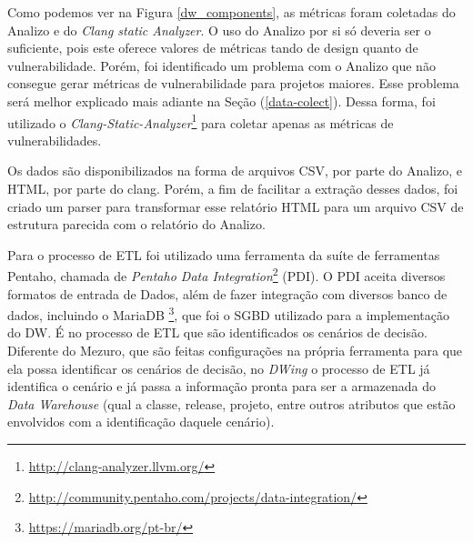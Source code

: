 Como podemos ver na Figura \ref{dw_components}, as métricas foram coletadas do Analizo e do \emph{Clang static Analyzer}. O uso do Analizo por si só deveria ser o suficiente, pois este oferece valores de métricas tando de design quanto de vulnerabilidade. Porém, foi identificado um problema com o Analizo que não consegue gerar métricas de vulnerabilidade para projetos maiores. Esse problema será melhor explicado mais adiante na Seção (\ref{data-colect}). Dessa forma, foi utilizado o \emph{Clang-Static-Analyzer}\footnote{\url{http://clang-analyzer.llvm.org/}} para coletar apenas as métricas de vulnerabilidades.

%
Os dados são disponibilizados na forma de arquivos CSV, por parte do Analizo, e HTML, por parte do clang. Porém, a fim de facilitar a extração desses dados, foi criado um parser para transformar esse relatório HTML para um arquivo CSV de estrutura parecida com o relatório do Analizo.


Para o processo de ETL foi utilizado uma ferramenta da suíte de ferramentas Pentaho, chamada de \emph{Pentaho Data Integration}\footnote{\url{http://community.pentaho.com/projects/data-integration/}} (PDI). O PDI aceita diversos formatos de entrada de Dados, além de fazer integração com diversos banco de dados, incluindo o MariaDB \footnote{\url{https://mariadb.org/pt-br/}}, que foi o SGBD utilizado para a implementação do DW. É no processo de ETL que são identificados os cenários de decisão. Diferente do Mezuro, que são feitas configurações na própria ferramenta para que ela possa identificar os cenários de decisão, no \emph{DWing} o processo de ETL já identifica o cenário e já passa a informação pronta para ser a armazenada do \emph{Data Warehouse} (qual a classe, release, projeto, entre outros atributos que estão envolvidos com a identificação daquele cenário).

